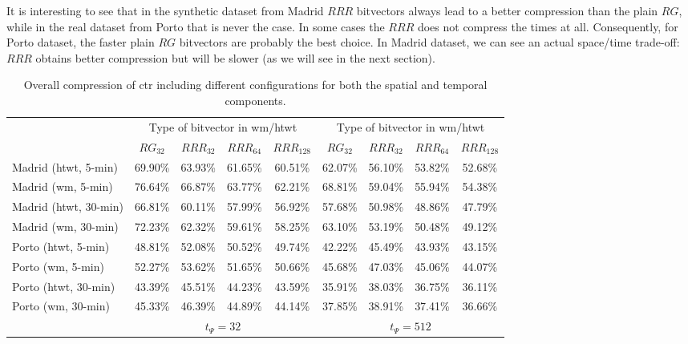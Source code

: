 	It is interesting to see that in the synthetic dataset from Madrid $RRR$ bitvectors always lead to a better 
	compression than the plain $RG$, while in the real dataset from Porto that is never the case. 
	In some cases the $RRR$ does not compress the times at all. Consequently, for Porto dataset, the faster plain $RG$ 
	bitvectors are probably the best choice. In Madrid dataset, we can see an actual space/time trade-off: $RRR$ obtains better
	compression but will be slower (as we will see in the next section).



	\begin{table}[ht!]
	\begin{center}
	\scriptsize
	\setlength\tabcolsep{2pt}
	  \begin{tabular}{|l|*{4}{c}|*{4}{c}|}
	  \cline{2-9}
	  \multicolumn{1}{c|}{} & \multicolumn{4}{c|}{Type of bitvector in \gls{wm}/\gls{htwt}}& \multicolumn{4}{c|}{Type of bitvector in \gls{wm}/\gls{htwt}} \\

	  \multicolumn{1}{c|}{}     &$RG_{32}$& $RRR_{32}$& $RRR_{64}$&$RRR_{128}$&$RG_{32}$& $RRR_{32}$& $RRR_{64}$&$RRR_{128}$ \\
	  \hline                                             
	  Madrid (\gls{htwt}, 5-min)  & 69.90\% &   63.93\% &   61.65\% &   60.51\% & 62.07\% &	56.10\% &	53.82\% &	 52.68\% \\
	  Madrid (\gls{wm}, 5-min)     & 76.64\% &   66.87\% &   63.77\% &   62.21\% & 68.81\% &	59.04\% &	55.94\% &	 54.38\% \\
	  Madrid (\gls{htwt}, 30-min) & 66.81\% &   60.11\% &   57.99\% &   56.92\% & 57.68\% &	50.98\% &	48.86\% &	 47.79\% \\
	  Madrid (\gls{wm}, 30-min)    & 72.23\% &   62.32\% &   59.61\% &   58.25\% & 63.10\% &	53.19\% &	50.48\% &	 49.12\% \\
	  \hline
	  Porto (\gls{htwt}, 5-min)   & 48.81\% &   52.08\% &   50.52\% &   49.74\% & 42.22\% &	45.49\% &	43.93\% &	 43.15\% \\
	  Porto (\gls{wm}, 5-min)      & 52.27\% &   53.62\% &   51.65\% &   50.66\% & 45.68\% &	47.03\% &	45.06\% &	 44.07\% \\
	  Porto (\gls{htwt}, 30-min)  & 43.39\% &   45.51\% &   44.23\% &   43.59\% & 35.91\% &	38.03\% &	36.75\% &	 36.11\% \\
	  Porto (\gls{wm}, 30-min)     & 45.33\% &   46.39\% &   44.89\% &   44.14\% & 37.85\% &	38.91\% &	37.41\% &	 36.66\% \\
	  \hline
	  \cline{2-9}
	  \multicolumn{1}{c|}{} & \multicolumn{4}{c|}{$t_{\Psi}=32$}& \multicolumn{4}{c|}{$t_{\Psi}=512$} \\
		\cline{2-9}
	  \end{tabular}
	\caption{Overall compression of \acrlong{ctr} including different configurations for both the spatial and temporal components.  }
	\label{table:ctr_spaces}
	\vspace{-4mm}
	\end{center}
	\end{table}


